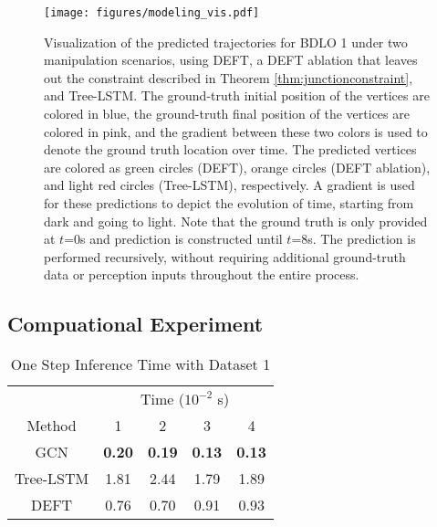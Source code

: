 \begin{figure*}[t]
    \centering
    \texttt{[image: figures/modeling\_vis.pdf]}
    \caption{Visualization of the predicted trajectories for BDLO 1 under two manipulation scenarios, using DEFT, a DEFT ablation that leaves out the constraint described in Theorem \ref{thm:junctionconstraint}, and Tree-LSTM. The ground-truth initial position of the vertices are colored in blue, the ground-truth final position of the vertices are colored in pink, and the gradient between these two colors is used to denote the ground truth location over time. 
    The predicted vertices are colored as green circles (DEFT), orange circles (DEFT ablation), and light red circles (Tree-LSTM), respectively.
    A gradient is used for these predictions to depict the evolution of time, starting from dark and going to light.
    Note that the ground truth is only provided at $t$=0s and prediction is constructed until $t$=8s.
    The prediction is performed recursively, without requiring additional ground-truth data or perception inputs throughout the entire process.}    
    \label{fig:modeling_vis}
\end{figure*}



\subsection{Compuational Experiment}
\label{sec:computationaltime}


\begin{table}[t]
    \caption{One Step Inference Time with Dataset 1}
    \begin{tabular}{c||cccc}
        \toprule
        & \multicolumn{4}{c}{Time ($10^{-2}$ s)} \\         
        Method & 1 & 2 & 3 & 4   \\
        \hline
        GCN \cite{GCN} & \textbf{0.20} & \textbf{0.19} & \textbf{0.13} & \textbf{0.13} \\
        Tree-LSTM \cite{treeLSTM} & 1.81 & 2.44 & 1.79 & 1.89 \\
        DEFT & 0.76 & 0.70 & 0.91 & 0.93  \\
        \bottomrule
    \end{tabular}
    \label{tab:computational speed1}
        \centering
\end{table}

